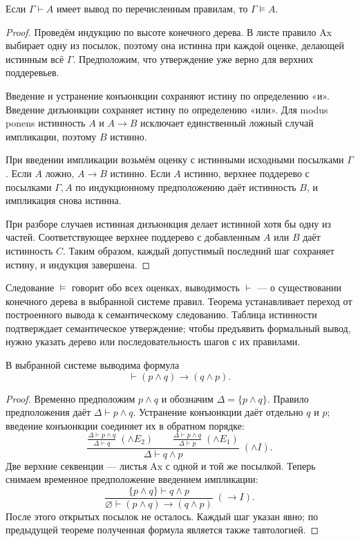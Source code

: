 \begin{theorem}\label{thm:legacy-c16-5}
Если \(\Gamma\vdash A\) имеет вывод по перечисленным правилам, то \(\Gamma\models A\).
\end{theorem}
\begin{proof}
Проведём индукцию по высоте конечного дерева. В листе правило \(\mathrm{Ax}\) выбирает одну из посылок, поэтому она истинна при каждой оценке, делающей истинным всё \(\Gamma\). Предположим, что утверждение уже верно для верхних поддеревьев.

Введение и устранение конъюнкции сохраняют истину по определению «и». Введение дизъюнкции сохраняет истину по определению «или». Для modus ponens истинность \(A\) и \(A\to B\) исключает единственный ложный случай импликации, поэтому \(B\) истинно.

При введении импликации возьмём оценку с истинными исходными посылками \(\Gamma\). Если \(A\) ложно, \(A\to B\) истинно. Если \(A\) истинно, верхнее поддерево с посылками \(\Gamma,A\) по индукционному предположению даёт истинность \(B\), и импликация снова истинна.

При разборе случаев истинная дизъюнкция делает истинной хотя бы одну из частей. Соответствующее верхнее поддерево с добавленным \(A\) или \(B\) даёт истинность \(C\). Таким образом, каждый допустимый последний шаг сохраняет истину, и индукция завершена.
\end{proof}
Следование \(\models\) говорит обо всех оценках, выводимость \(\vdash\) — о существовании конечного дерева в выбранной системе правил. Теорема устанавливает переход от построенного вывода к семантическому следованию. Таблица истинности подтверждает семантическое утверждение; чтобы предъявить формальный вывод, нужно указать дерево или последовательность шагов с их правилами.

\begin{theorem}\label{thm:legacy-c16-6}
В выбранной системе выводима формула
\[
\vdash(p\land q)\to(q\land p).
\]
\end{theorem}
\begin{proof}
Временно предположим \(p\land q\) и обозначим \(\Delta=\{p\land q\}\). Правило предположения даёт \(\Delta\vdash p\land q\). Устранение конъюнкции даёт отдельно \(q\) и \(p\); введение конъюнкции соединяет их в обратном порядке:
\[
\frac{
 \displaystyle\frac{\Delta\vdash p\land q}{\Delta\vdash q}\;(\land E_2)
 \qquad
 \displaystyle\frac{\Delta\vdash p\land q}{\Delta\vdash p}\;(\land E_1)
}{
 \Delta\vdash q\land p
}\;(\land I).
\]
Две верхние секвенции — листья \(\mathrm{Ax}\) с одной и той же посылкой. Теперь снимаем временное предположение введением импликации:
\[
\frac{\{p\land q\}\vdash q\land p}
{\varnothing\vdash(p\land q)\to(q\land p)}\;(\to I).
\]
После этого открытых посылок не осталось. Каждый шаг указан явно; по предыдущей теореме полученная формула является также тавтологией.
\end{proof}

